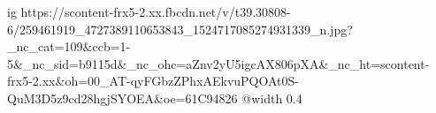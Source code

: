  
 
 
 
 

\ifcmt
  ig https://scontent-frx5-2.xx.fbcdn.net/v/t39.30808-6/259461919_4727389110653843_1524717085274931339_n.jpg?_nc_cat=109&ccb=1-5&_nc_sid=b9115d&_nc_ohc=aZnv2yU5igcAX806pXA&_nc_ht=scontent-frx5-2.xx&oh=00_AT-qyFGbzZPhxAEkvuPQOAt0S-QuM3D5z9cd28hgjSYOEA&oe=61C94826
  @width 0.4
\fi
